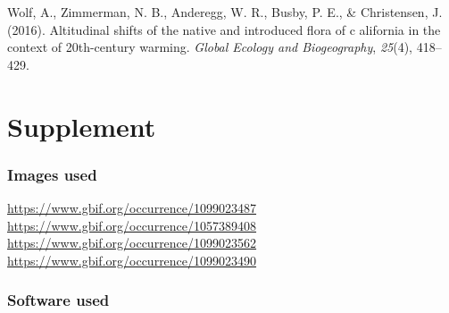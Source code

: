 \documentclass[man,floatsintext]{apa6}
\theoremstyle{definition}
\theoremstyle{definition}
\theoremstyle{definition}
\theoremstyle{remark}
\begin{document}
\leavevmode\hypertarget{ref-wolf2016altitudinal}{}%
Wolf, A., Zimmerman, N. B., Anderegg, W. R., Busby, P. E., \&
Christensen, J. (2016). Altitudinal shifts of the native and introduced
flora of c alifornia in the context of 20th-century warming.
\emph{Global Ecology and Biogeography}, \emph{25}(4), 418--429.

\endgroup

\newpage
\setcounter{table}{0}  \renewcommand{\thetable}{S\arabic{table}} \setcounter{figure}{0} \renewcommand{\thefigure}{S\arabic{figure}}

\hypertarget{supplement}{%
\section{Supplement}\label{supplement}}

\hypertarget{images-used}{%
\subsubsection{Images used}\label{images-used}}

\url{https://www.gbif.org/occurrence/1099023487}
\url{https://www.gbif.org/occurrence/1057389408}
\url{https://www.gbif.org/occurrence/1099023562}
\url{https://www.gbif.org/occurrence/1099023490}

\hypertarget{software-used}{%
\subsubsection{Software used}\label{software-used}}
\end{document}
